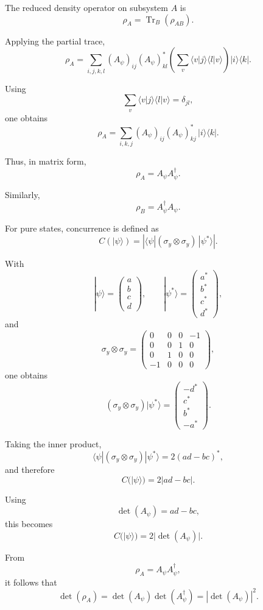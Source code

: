 \documentclass[a4paper]{article}
\begin{document}
The reduced density operator on subsystem \(A\) is
\[
\rho_A = \operatorname{Tr}_B(\rho_{AB}).
\]

Applying the partial trace,
\[
\rho_A
=
\sum_{i,j,k,l}
(A_\psi)_{ij}(A_\psi)^*_{kl}
\left(
\sum_v \langle v|j\rangle \langle l|v\rangle
\right)
|i\rangle\langle k|.
\]

Using
\[
\sum_v \langle v|j\rangle \langle l|v\rangle = \delta_{jl},
\]
one obtains
\[
\rho_A
=
\sum_{i,k,j}
(A_\psi)_{ij}(A_\psi)^*_{kj}
\,|i\rangle\langle k|.
\]

Thus, in matrix form,
\[
\rho_A = A_\psi A_\psi^\dagger.
\]

Similarly,
\[
\rho_B = A_\psi^\dagger A_\psi.
\]

For pure states, concurrence is defined as
\[
C(|\psi\rangle)
=
\left|
\langle \psi | (\sigma_y \otimes \sigma_y)\,|\psi^*\rangle
\right|.
\]

With
\[
|\psi\rangle =
\begin{pmatrix}
a\\ b\\ c\\ d
\end{pmatrix},
\qquad
|\psi^*\rangle =
\begin{pmatrix}
a^*\\ b^*\\ c^*\\ d^*
\end{pmatrix},
\]
and
\[
\sigma_y \otimes \sigma_y =
\begin{pmatrix}
0 & 0 & 0 & -1\\
0 & 0 & 1 & 0\\
0 & 1 & 0 & 0\\
-1 & 0 & 0 & 0
\end{pmatrix},
\]
one obtains
\[
(\sigma_y \otimes \sigma_y)|\psi^*\rangle
=
\begin{pmatrix}
- d^*\\
c^*\\
b^*\\
- a^*
\end{pmatrix}.
\]

Taking the inner product,
\[
\langle \psi | (\sigma_y \otimes \sigma_y)|\psi^*\rangle
=
2(ad - bc)^*,
\]
and therefore
\[
C(|\psi\rangle)=2|ad-bc|.
\]

Using
\[
\det(A_\psi) = ad - bc,
\]
this becomes
\[
C(|\psi\rangle)=2|\det(A_\psi)|.
\]

From
\[
\rho_A = A_\psi A_\psi^\dagger,
\]
it follows that
\[
\det(\rho_A)
=
\det(A_\psi)\det(A_\psi^\dagger)
=
|\det(A_\psi)|^2.
\]
\end{document}
